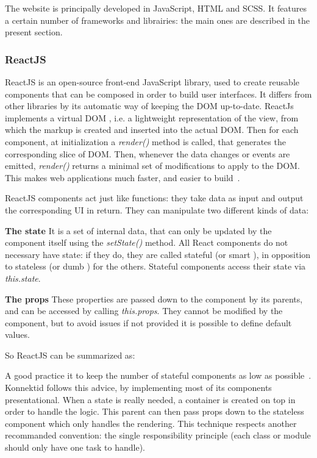 The website is principally developed in JavaScript, HTML and SCSS. It features a certain number of frameworks and librairies: the main ones are described in the present section.

\subsubsection{ReactJS}
\label{sssec:react}

ReactJS is an open-source front-end JavaScript library, used to create reusable components that can be composed in order to build user interfaces. It differs from other libraries by its automatic way of keeping the DOM up-to-date. ReactJs implements a \guillemotleft{} virtual DOM \guillemotright{}, i.e. a lightweight representation of the view, from which the markup is created and inserted into the actual DOM. Then for each component, at initialization a \textit{render()} method is called, that generates the corresponding slice of DOM. Then, whenever the data changes or events are emitted, \textit{render()} returns a minimal set of modifications to apply to the DOM.
This makes web applications much faster, and easier to build~\cite{whyReact}.

ReactJS components act just like functions: they take data as input and output the corresponding UI in return. They can manipulate two different kinds of data:

\textbf{The state} It is a set of internal data, that can only be updated by the component itself using the \textit{setState()}  method. All React components do not necessary have state: if they do, they are called \guillemotleft{} stateful \guillemotright{} (or \guillemotleft{} smart \guillemotright{}), in opposition to \guillemotleft{} stateless \guillemotright{} (or \guillemotleft{} dumb \guillemotright{}) for the others. Stateful components access their state via \textit{this.state}.

\textbf{The props} These properties are passed down to the component by its parents, and can be accessed by calling \textit{this.props}. They cannot be modified by the component, but to avoid issues if not provided it is possible to define default values.

So ReactJS can be summarized as: 

A good practice it to keep the number of stateful components as low as possible~\cite{state}. Konnektid follows this advice, 
by implementing most of its components presentational. When a state is really needed, a \guillemotleft{} container \guillemotright{} is created on top in order to handle the logic. This parent can then pass props down to the stateless component which only handles the rendering. This technique respects another recommanded convention: the single responsibility principle (each class or module should only have one task to handle). 

